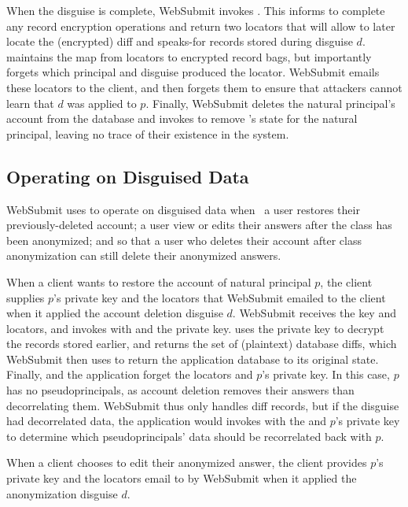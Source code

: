 %
When the disguise is complete, WebSubmit invokes .
%
This informs \sys to complete any record encryption operations and return two
locators  that will allow \sys to later locate the (encrypted) diff and
speaks-for records stored during disguise $d$.
%
\sys maintains the map from locators to encrypted record bags, but importantly
forgets which principal and disguise produced the locator.
%
WebSubmit emails these locators to the client, and then forgets them to ensure
that attackers cannot learn that $d$ was applied to $p$.
%
Finally, WebSubmit deletes the natural principal's account from the database and
invokes  to remove \sys's state for the natural principal,
leaving no trace of their existence in the system.
%

\subsection{Operating on Disguised Data}
\label{s:op-disg}

%
WebSubmit uses \sys to operate on disguised data when \one{} a user restores their
previously-deleted account; \two{} a user view or edits their answers after the
class has been anonymized; and \three{} so that a user who deletes their account
after class anonymization can still delete their anonymized answers.
%

%
When a client wants to restore the account of natural principal $p$, the client
supplies $p$'s private key and the locators  that WebSubmit emailed to
the client when it applied the account deletion disguise $d$.
%
WebSubmit receives the key and locators, and invokes  with
 and the private key.
%
\sys uses the private key to decrypt the records stored earlier, and returns the
set of (plaintext) database diffs, which WebSubmit then uses to return the
application database to its original state.
%
Finally, \sys and the application forget the locators and $p$'s private key.
%
In this case, $p$ has no pseudoprincipals, as account deletion removes their
answers than decorrelating them.
%
WebSubmit thus only handles diff records, but if the disguise had decorrelated
data, the application would invokes  with the 
and $p$'s private key to determine which pseudoprincipals' data should be
recorrelated back with $p$.
%

%
When a client chooses to edit their anonymized answer, the client provides $p$'s
private key and the locators  email to by WebSubmit when it applied
the anonymization disguise $d$.

